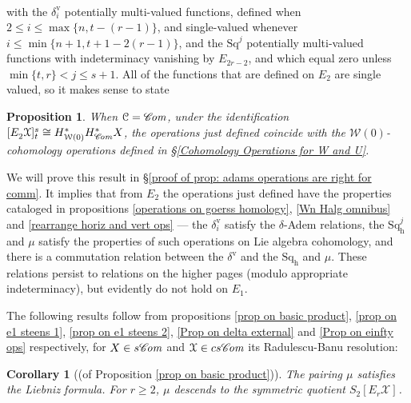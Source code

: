\documentclass[11pt]{amsart} \renewcommand{\baselinestretch}{1.2}
\theoremstyle{plain}
\newtheorem{prop}[thm]{Proposition}
\newtheorem{cor}[thm]{Corollary}
\numberwithin{equation}{section} %
\theoremstyle{plain}
\newtheorem{prop}[thm]{Proposition}
\newtheorem{cor}[thm]{Corollary}
\numberwithin{equation}{chapter} %
\newcommand{\scrC}{\mathscr{C}}
\newcommand{\calw}{\mathcal{W}}
\newcommand{\calx}{\mathcal{X}}
\newcommand{\calc}{\mathcal{C}}
\newcommand{\Sq}{\mathrm{Sq}}
\newcommand{\algs}{{\scrC\!\textit{\normalfont\textit{om}}}}
\newcommand{\E}[5]{[E^{#1}_{#2}#3]^{#4}_{#5}}
\newcommand{\Edownup}[5]{[E_{#1}^{#2}#3]^{#4}_{#5}}
\newcommand{\uver}{^\mathrm{v}}
\newcommand{\dhor}{_\mathrm{h}}
\newcommand{\Sqh}{\mathrm{Sq}\dhor}
\newcommand{\deltav}{\delta\uver}
\begin{document}
\begin{Operations on the Bousfield-Kan spectral sequence}
\begin{gather*}
\end{gather*}
with the $\deltav_i$ potentially multi-valued functions,  defined when $2\leq i\leq \max\{n,t-(r-1)\}$, and single-valued whenever $i\leq\min\{n+1,t+1-2(r-1)\}$, and the $\Sq^j$ potentially multi-valued functions with indeterminacy vanishing by $E_{2r-2}$, and which equal zero unless $\min\{t,r\}< j\leq s+1$.  All of the functions that are  defined on $E_2$ are single valued, so it makes sense to state 
\begin{prop}
\label{adams operations are right for comm}
When $\calc=\algs$,
under the identification $\E{}{2}{\calx}{s}{t}\cong H^*_{\calw(0)}H^*_{\algs}X$, the operations just defined coincide with the  ${\calw(0)}$-cohomology operations defined in \S\ref{Cohomology Operations for W and U}.
\end{prop}
\noindent We will prove this result in \S\ref{proof of prop: adams operations are right for comm}. It implies that from $E_2$ the operations just defined have the properties cataloged in propositions \ref{operations on goerss homology}, \ref{Wn Halg omnibus} and \ref{rearrange horiz and vert ops} --- the $\deltav_i$ satisfy the $\delta$-Adem relations, the $\Sqh^j$ and $\mu$ satisfy the properties of such operations on Lie algebra cohomology, and there is a commutation relation between the $\deltav$ and the $\Sqh$ and $\mu$. These relations persist to relations on the higher pages (modulo appropriate indeterminacy), but evidently do not hold on $E_1$.


The following results follow from propositions \ref{prop on basic product}, \ref{prop on e1 steens 1}, \ref{prop on e1 steens 2}, \ref{Prop on delta external} and \ref{Prop on einfty ops} respectively, for $X\in s\algs$ and $\calx\in cs\algs$ its Radulescu-Banu resolution:
\begin{cor}[(of Proposition \ref{prop on basic product})]
\label{prop on basic product composed with lift}
The pairing $\mu$ satisfies the Liebniz formula. For $r\geq2$, $\mu$ descends to the symmetric quotient $S_2\Edownup{r}{}{\calx}{}{}$.
\end{cor}



\end{Operations on the Bousfield-Kan spectral sequence}
\end{document}

